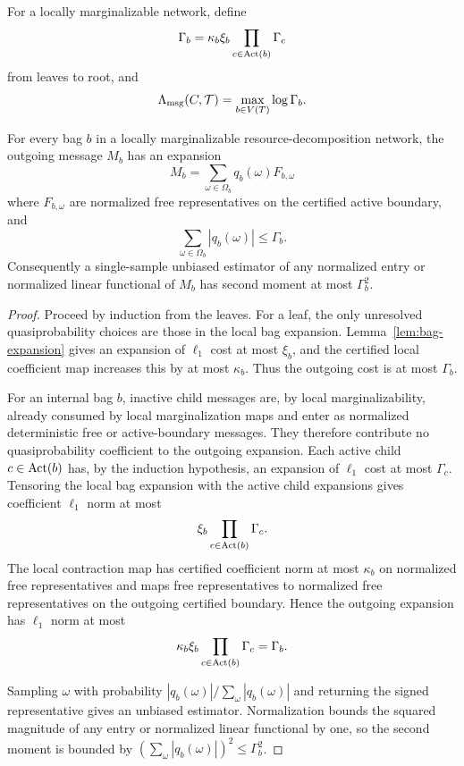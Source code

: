 \begin{stackdefinition}
\label{def:constructive-burden}
For a locally marginalizable network, define
\[
\Gamma_b=\kappa_b\xi_b\prod_{c\in\operatorname{Act}(b)}\Gamma_c
\]
from leaves to root, and
\[
\Lambda_{\mathrm{msg}}(C,\mathcal{T})=\max_{b\in V(T)}\log\Gamma_b .
\]
\end{stackdefinition}

\begin{lemma}
\label{lem:message-recurrence}
For every bag \(b\) in a locally marginalizable resource-decomposition network, the outgoing message \(M_b\) has an expansion
\[
M_b=\sum_{\omega\in\Omega_b} q_b(\omega) F_{b,\omega}
\]
where \(F_{b,\omega}\) are normalized free representatives on the certified active boundary, and
\[
\sum_{\omega\in\Omega_b}|q_b(\omega)|\le \Gamma_b .
\]
Consequently a single-sample unbiased estimator of any normalized entry or normalized linear functional of \(M_b\) has second moment at most \(\Gamma_b^2\).
\end{lemma}

\begin{proof}
Proceed by induction from the leaves. For a leaf, the only unresolved quasiprobability choices are those in the local bag expansion. Lemma~\ref{lem:bag-expansion} gives an expansion of \(\ell_1\) cost at most \(\xi_b\), and the certified local coefficient map increases this by at most \(\kappa_b\). Thus the outgoing cost is at most \(\Gamma_b\).

For an internal bag \(b\), inactive child messages are, by local marginalizability, already consumed by local marginalization maps and enter as normalized deterministic free or active-boundary messages. They therefore contribute no quasiprobability coefficient to the outgoing expansion. Each active child \(c\in\operatorname{Act}(b)\) has, by the induction hypothesis, an expansion of \(\ell_1\) cost at most \(\Gamma_c\). Tensoring the local bag expansion with the active child expansions gives coefficient \(\ell_1\) norm at most
\[
\xi_b\prod_{c\in\operatorname{Act}(b)}\Gamma_c .
\]
The local contraction map has certified coefficient norm at most \(\kappa_b\) on normalized free representatives and maps free representatives to normalized free representatives on the outgoing certified boundary. Hence the outgoing expansion has \(\ell_1\) norm at most
\[
\kappa_b\xi_b\prod_{c\in\operatorname{Act}(b)}\Gamma_c=\Gamma_b .
\]

Sampling \(\omega\) with probability \(|q_b(\omega)|/\sum_\omega |q_b(\omega)|\) and returning the signed representative gives an unbiased estimator. Normalization bounds the squared magnitude of any entry or normalized linear functional by one, so the second moment is bounded by \((\sum_\omega |q_b(\omega)|)^2\le \Gamma_b^2\).
\end{proof}

